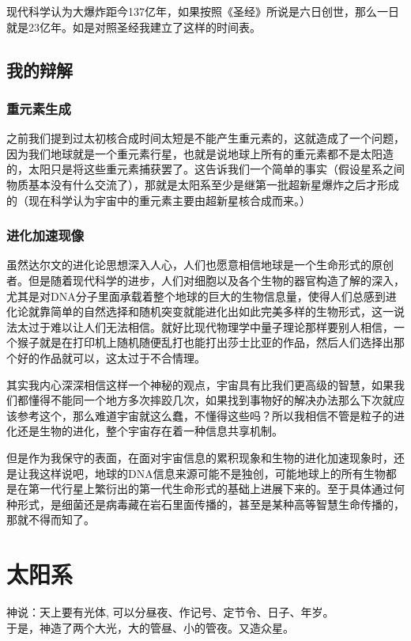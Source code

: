 \documentclass[12pt]{exam}%
\begin{document}
现代科学认为大爆炸距今137亿年，如果按照《圣经》所说是六日创世，那么一日就是23亿年。如是对照圣经我建立了这样的时间表。

\subsection{我的辩解}
\subsubsection{重元素生成}
之前我们提到过太初核合成时间太短是不能产生重元素的，这就造成了一个问题，因为我们地球就是一个重元素行星，也就是说地球上所有的重元素都不是太阳造的，太阳只是将这些重元素捕获罢了。这告诉我们一个简单的事实（假设星系之间物质基本没有什么交流了），那就是太阳系至少是继第一批超新星爆炸之后才形成的（现在科学认为宇宙中的重元素主要由超新星核合成而来。）

\subsubsection{进化加速现像}
虽然达尔文的进化论思想深入人心，人们也愿意相信地球是一个生命形式的原创者。但是随着现代科学的进步，人们对细胞以及各个生物的器官构造了解的深入，尤其是对DNA分子里面承载着整个地球的巨大的生物信息量，使得人们总感到进化论就靠简单的自然选择和随机突变就能进化出如此完美多样的生物形式，这一说法太过于难以让人们无法相信。就好比现代物理学中量子理论那样要别人相信，一个猴子就是在打印机上随机随便乱打也能打出莎士比亚的作品，然后人们选择出那个好的作品就可以，这太过于不合情理。

其实我内心深深相信这样一个神秘的观点，宇宙具有比我们更高级的智慧，如果我们都懂得不能同一个地方多次摔跤几次，如果找到事物好的解决办法那么下次就应该参考这个，那么难道宇宙就这么蠢，不懂得这些吗？所以我相信不管是粒子的进化还是生物的进化，整个宇宙存在着一种信息共享机制。

但是作为我保守的表面，在面对宇宙信息的累积现象和生物的进化加速现象时，还是让我这样说吧，地球的DNA信息来源可能不是独创，可能地球上的所有生物都是在第一代行星上繁衍出的第一代生命形式的基础上进展下来的。至于具体通过何种形式，是细菌还是病毒藏在岩石里面传播的，甚至是某种高等智慧生命传播的，那就不得而知了。


\section{太阳系}
\begin{flushright}
\begin{notecard}[ce7f4fe]{15em}
神说：天上要有光体, 可以分昼夜、作记号、定节令、日子、年岁。\\
于是，神造了两个大光，大的管昼、小的管夜。又造众星。  
\end{notecard}
\end{flushright}
\end{document}
